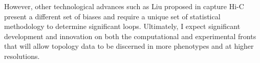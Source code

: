 \documentclass[12pt]{article}
\begin{document}
\begin{addmargin}[6.5mm]{4mm}
However, other technological advances such as Liu proposed in capture Hi-C present a different set of biases and require a unique set of statistical methodology to determine significant loops. Ultimately, I expect significant development and innovation on both the computational and experimental fronts that will allow topology data to be discerned in more phenotypes and at higher resolutions. 

\end{addmargin}
\end{document}
